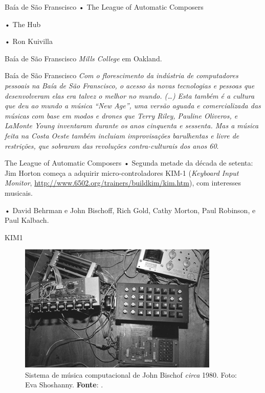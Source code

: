\documentclass[aspectratio=169]{beamer}
\begin{document}
\begin{frame}{Baía de São Franscisco}
• The League of Automatic Composers

• The Hub

• Ron Kuivilla
\end{frame}

\begin{frame}{Baía de São Franscisco}
\emph{Mills College} em Oakland. 
\end{frame}

\begin{frame}{Baía de São Franscisco}
\emph{Com o florescimento da indústria de computadores pessoais na Baía de São Franscisco, o acesso às novas tecnologias e pessoas que desenvolveram elas era talvez o melhor no mundo. (\ldots) Esta também é a cultura que deu ao mundo a música ``New Age'', uma versão aguada e comercializada das músicas com base em modos e drones que Terry Riley, Pauline Oliveros, e LaMonte Young inventaram durante os anos cinquenta e sessenta. Mas a música feita na Costa Oeste também incluiam improvisações barulhentas e livre de restrições, que sobraram das revoluções contra-culturais dos anos 60}\cite{brown_indigenous_2013}.
\end{frame}

\begin{frame}{The League of Automatic Composers}
• Segunda metade da década de setenta: Jim Horton começa a adquirir micro-controladores KIM-1 (\emph{Keyboard Input Monitor}, \url{http://www.6502.org/trainers/buildkim/kim.htm}), com interesses musicais. 

• David Behrman e John Bischoff, Rich Gold, Cathy Morton, Paul Robinson, e Paul Kalbach.
\end{frame}

\begin{frame}{KIM1}
\begin{figure}[!h]
  \centering
  \includegraphics[scale=0.7]{imagens/siskim1.jpg}
  \caption{Sistema de música computacional de John Bischof \emph{circa} 1980. Foto: Eva Shoshanny\protect\footnotemark. \textbf{Fonte}: .}
  \label{fig:siskim1}
\end{figure}
\end{frame}
\end{document}
